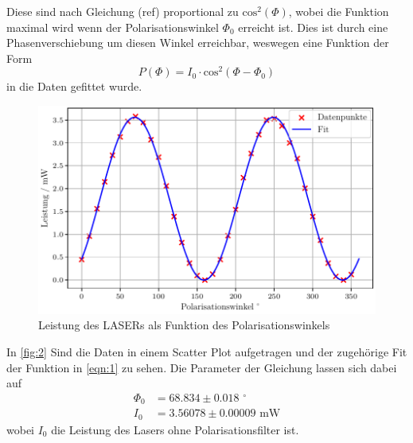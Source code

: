\noindent 
Diese sind nach Gleichung (ref) proportional zu $\text{cos}^2\left(\Phi\right)$, wobei die Funktion maximal wird wenn der Polarisationswinkel $\Phi_0$ erreicht ist. Dies ist durch eine Phasenverschiebung um diesen Winkel erreichbar, weswegen eine Funktion der Form 
\begin{equation}
  \label{eqn:1}
  P\left(\Phi\right) = I_0 \cdot \text{cos}^2\left(\Phi - \Phi_0\right)
\end{equation}
in die Daten gefittet wurde.
\begin{figure}[H]
  \centering
  \includegraphics[width=0.7\linewidth]{plots/pol.pdf}
  \caption{Leistung des LASERs als Funktion des Polarisationswinkels}
  \label{fig:2}
\end{figure}
\noindent
In \autoref{fig:2} Sind die Daten in einem Scatter Plot aufgetragen und der zugehörige Fit der Funktion in \autoref{eqn:1} zu sehen.
Die Parameter der Gleichung lassen sich dabei auf 
\begin{align}
  \Phi_0 &= 68.834 \pm 0.018 \, \, ^\circ \\
  I_0 &= 3.56078 \pm 0.00009 \, \, \mathrm{mW}
\end{align}
wobei $I_0$ die Leistung des Lasers ohne Polarisationsfilter ist. 
\noindent
\newpage 
